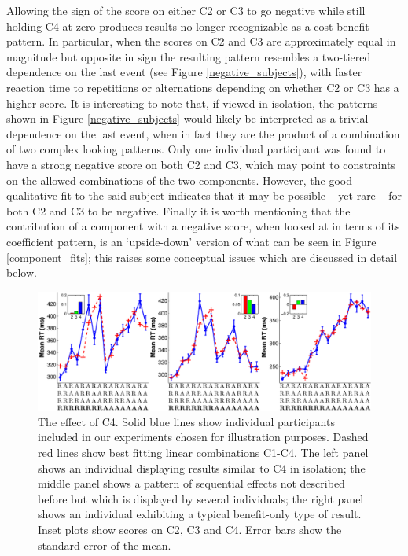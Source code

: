 \documentclass{apa}[12pt]
\begin{document}
Allowing the sign of the score on either C2 or C3 to go negative while still holding C4 at zero produces results no longer recognizable as a cost-benefit pattern. In particular, when the scores on C2 and C3 are approximately equal in magnitude but opposite in sign the resulting pattern resembles a two-tiered dependence on the last event (see Figure \ref{negative_subjects}), with faster reaction time to repetitions or alternations depending on whether C2 or C3 has a higher score. It is interesting to note that, if viewed in isolation, the patterns shown in Figure \ref{negative_subjects} would likely be interpreted as a trivial dependence on the last event, when in fact they are the product of a combination of two complex looking patterns. Only one individual participant was found to have a strong negative score on both C2 and C3, which may point to constraints on the allowed combinations of the two components. However, the good qualitative fit to the said subject indicates that it may be possible -- yet rare -- for both C2 and C3 to be negative. Finally it is worth mentioning that the contribution of a component with a negative score, when looked at in terms of its coefficient pattern, is an `upside-down' version of what can be seen in Figure \ref{component_fits}; this raises some conceptual issues which are discussed in detail below.

\begin{figure}[t]
\centering
\includegraphics[width=1\textwidth]{c4.pdf}
\caption[The effect of C4]{The effect of C4. Solid blue lines show individual participants included in our experiments chosen for illustration purposes. Dashed red lines show best fitting linear combinations C1-C4. The left panel shows an individual displaying results similar to C4 in isolation; the middle panel shows a pattern of sequential effects not described before but which is displayed by several individuals; the right panel shows an individual exhibiting a typical benefit-only type of result. Inset plots show scores on C2, C3 and C4. Error bars show the standard error of the mean.} \label{c4_effect}
\end{figure}
\end{document}
